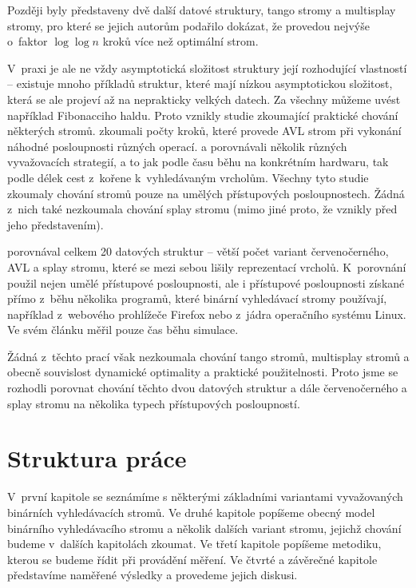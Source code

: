 Později byly představeny dvě další datové struktury, tango stromy a multisplay stromy, pro které se jejich autorům podařilo dokázat, že provedou nejvýše o~faktor $\log\log n$ kroků více než optimální strom.

V~praxi je ale ne vždy asymptotická složitost struktury její rozhodující
vlastností -- existuje mnoho příkladů struktur, které mají nízkou
asymptotickou složitost, která se ale projeví až na neprakticky velkých datech. Za
všechny můžeme uvést například Fibonacciho haldu. Proto vznikly studie
zkoumající praktické chování některých stromů. \citet{AVLperformance} zkoumali
počty kroků, které provede AVL strom při vykonání náhodné
posloupnosti různých operací. \citet{comparison} a \citet{comparison2}
porovnávali několik různých vyvažovacích strategií, a to jak podle času běhu na konkrétním hardwaru, tak
podle délek cest z~kořene k~vyhledávaným vrcholům. Všechny tyto studie zkoumaly
chování stromů pouze na umělých přístupových posloupnostech. Žádná z~nich také
nezkoumala chování splay stromu (mimo jiné proto, že vznikly před jeho představením).


\citet{performance} porovnával celkem 20 datových struktur -- větší počet variant červenočerného, AVL a splay stromu, které se mezi sebou lišily reprezentací vrcholů. K~porovnání použil nejen umělé přístupové posloupnosti, ale i přístupové posloupnosti získané přímo z~běhu několika programů, které binární vyhledávací stromy používají, například z~webového prohlížeče Firefox nebo z~jádra operačního systému Linux. Ve svém článku měřil pouze čas běhu simulace.

Žádná z~těchto prací však nezkoumala chování tango stromů, multisplay stro\-mů a obecně souvislost dynamické optimality a praktické použitelnosti. Proto jsme se rozhodli porovnat chování těchto dvou datových struktur a dále červenočerného a splay stromu na několika typech přístupových posloupností.

\section*{Struktura práce}

V~první kapitole se seznámíme s některými základními variantami vyvažovaných binárních
vyhledávacích stromů. Ve druhé kapitole popíšeme obecný model binárního
vyhledávacího stromu a několik dalších variant stromu, jejichž chování
budeme v~dalších kapitolách zkoumat. Ve třetí kapitole popíšeme metodiku,
kterou se budeme řídit při provádění měření. Ve čtvrté a závěrečné kapitole
představíme naměřené výsledky a provedeme jejich diskusi.
